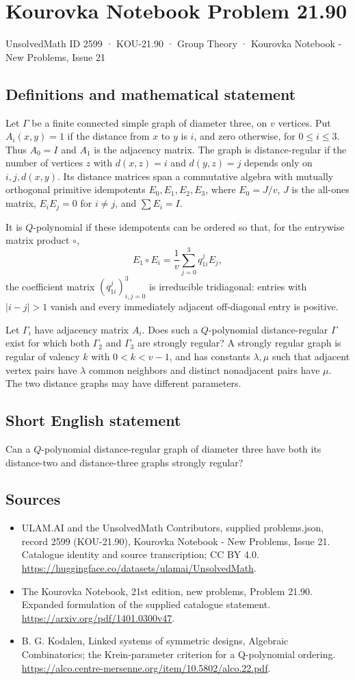 \documentclass[11pt,a4paper]{article}
\begin{document}
\section*{Kourovka Notebook Problem 21.90}\label{2599}
{\small UnsolvedMath ID 2599 · KOU-21.90 · Group Theory · Kourovka Notebook - New Problems, Issue 21}
\subsection{Definitions and mathematical statement}
Let $\Gamma$ be a finite connected simple graph of diameter three, on $v$
vertices. Put $A_i(x,y)=1$ if the distance from $x$ to $y$ is $i$, and zero
otherwise, for $0\leq i\leq3$. Thus $A_0=I$ and $A_1$ is the adjacency matrix.
The graph is distance-regular if the number of vertices $z$ with
$d(x,z)=i$ and $d(y,z)=j$ depends only on $i,j,d(x,y)$.
Its distance matrices span a commutative algebra with mutually orthogonal
primitive idempotents $E_0,E_1,E_2,E_3$, where $E_0=J/v$, $J$ is the all-ones
matrix, $E_iE_j=0$ for $i\ne j$, and $\sum E_i=I$.

It is $Q$-polynomial if these idempotents can be ordered so that, for the
entrywise matrix product $\circ$,
\[
E_1\circ E_i=\frac1v\sum_{j=0}^3 q_{1i}^{j}E_j,
\]
the coefficient matrix $(q_{1i}^{j})_{i,j=0}^3$ is irreducible tridiagonal:
entries with $|i-j|>1$ vanish and every immediately adjacent off-diagonal
entry is positive.

Let $\Gamma_i$ have adjacency matrix $A_i$. Does such a $Q$-polynomial
distance-regular $\Gamma$ exist for which both $\Gamma_2$ and $\Gamma_3$ are
strongly regular? A strongly regular graph is regular of valency $k$ with
$0<k<v-1$, and has constants $\lambda,\mu$ such that adjacent vertex pairs
have $\lambda$ common neighbors and distinct nonadjacent pairs have $\mu$.
The two distance graphs may have different parameters.
\subsection{Short English statement}
Can a $Q$-polynomial distance-regular graph of diameter three have both its distance-two and distance-three graphs strongly regular?
\subsection{Sources}
\begin{itemize}
\item[S1] ULAM.AI and the UnsolvedMath Contributors, supplied problems.json, record 2599 (KOU-21.90), Kourovka Notebook - New Problems, Issue 21. Catalogue identity and source transcription; CC BY 4.0.
\url{https://huggingface.co/datasets/ulamai/UnsolvedMath}.
\item[S2] The Kourovka Notebook, 21st edition, new problems, Problem 21.90. Expanded formulation of the supplied catalogue statement.
\url{https://arxiv.org/pdf/1401.0300v47}.
\item[S3] B. G. Kodalen, Linked systems of symmetric designs, Algebraic Combinatorics; the Krein-parameter criterion for a Q-polynomial ordering.
\url{https://alco.centre-mersenne.org/item/10.5802/alco.22.pdf}.
\end{itemize}
\end{document}

